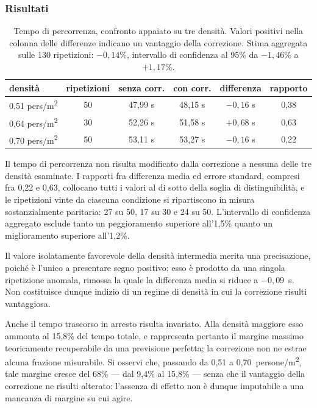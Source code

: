 \subsubsection{Risultati}

\begin{table}[h]
\centering
\begin{tabular}{lccccc}
\hline
densità & ripetizioni & senza corr. & con corr. & differenza & rapporto \\
\hline
0,51 pers/m\textsuperscript{2} & 50 & 47,99 s & 48,15 s & $-0{,}16$ s & 0,38 \\
0,64 pers/m\textsuperscript{2} & 30 & 52,26 s & 51,58 s & $+0{,}68$ s & 0,63 \\
0,70 pers/m\textsuperscript{2} & 50 & 53,11 s & 53,27 s & $-0{,}16$ s & 0,22 \\
\hline
\end{tabular}
\caption{Tempo di percorrenza, confronto appaiato su tre densità. Valori positivi nella
colonna delle differenze indicano un vantaggio della correzione. Stima aggregata sulle 130
ripetizioni: $-0{,}14\%$, intervallo di confidenza al 95\% da $-1{,}46\%$ a $+1{,}17\%$.}
\label{tab:tempi-densita}
\end{table}

Il tempo di percorrenza non risulta modificato dalla correzione a nessuna delle tre
densità esaminate. I rapporti fra differenza media ed errore standard, compresi fra 0,22 e
0,63, collocano tutti i valori al di sotto della soglia di distinguibilità, e le
ripetizioni vinte da ciascuna condizione si ripartiscono in misura sostanzialmente
paritaria: 27 su 50, 17 su 30 e 24 su 50. L'intervallo di confidenza aggregato esclude
tanto un peggioramento superiore all'1,5\% quanto un miglioramento superiore all'1,2\%.

Il valore isolatamente favorevole della densità intermedia merita una precisazione, poiché
è l'unico a presentare segno positivo: esso è prodotto da una singola ripetizione anomala,
rimossa la quale la differenza media si riduce a $-0{,}09$~s. Non costituisce dunque
indizio di un regime di densità in cui la correzione risulti vantaggiosa.

Anche il tempo trascorso in arresto risulta invariato. Alla densità maggiore esso ammonta
al 15,8\% del tempo totale, e rappresenta pertanto il margine massimo teoricamente
recuperabile da una previsione perfetta; la correzione non ne estrae alcuna frazione
misurabile. Si osservi che, passando da 0,51 a 0,70~persone/m\textsuperscript{2}, tale
margine cresce del 68\% --- dal 9,4\% al 15,8\% --- senza che il vantaggio della
correzione ne risulti alterato: l'assenza di effetto non è dunque imputabile a una
mancanza di margine su cui agire.

